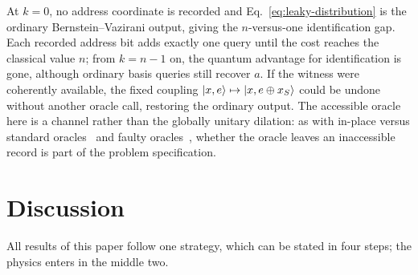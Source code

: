 \documentclass[
  aps,
  pra,
  reprint,
  nofootinbib
]{revtex4-2}
\begin{document}
At \(k=0\), no address coordinate is recorded and
Eq.~\eqref{eq:leaky-distribution} is the ordinary Bernstein--Vazirani output,
giving the \(n\)-versus-one identification gap. Each recorded address bit adds
exactly one query until the cost reaches the classical value \(n\); from
\(k=n-1\) on, the quantum advantage for identification is gone, although
ordinary basis queries still recover \(a\). If the witness were coherently available, the
fixed coupling \(\ket{x,e}\mapsto\ket{x,e\oplus x_S}\) could be undone without
another oracle call, restoring the ordinary output. The accessible oracle here
is a channel rather than the globally unitary dilation: as with in-place versus
standard oracles~\cite{KashefiKentVedralBanaszek2002} and faulty
oracles~\cite{RegevSchiff2008}, whether the oracle leaves an inaccessible
record is part of the problem specification.

\section{Discussion}
\label{sec:discussion}

All results of this paper follow one strategy, which can be stated in four
steps; the physics enters in the middle two.
\end{document}
